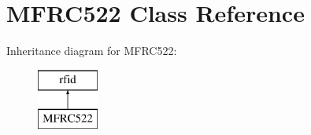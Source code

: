 \hypertarget{class_m_f_r_c522}{}\section{M\+F\+R\+C522 Class Reference}
\label{class_m_f_r_c522}
Inheritance diagram for M\+F\+R\+C522\+:\begin{figure}[H]
\begin{center}
\leavevmode
\includegraphics[height=2.000000cm]{class_m_f_r_c522}
\end{center}
\end{figure}
